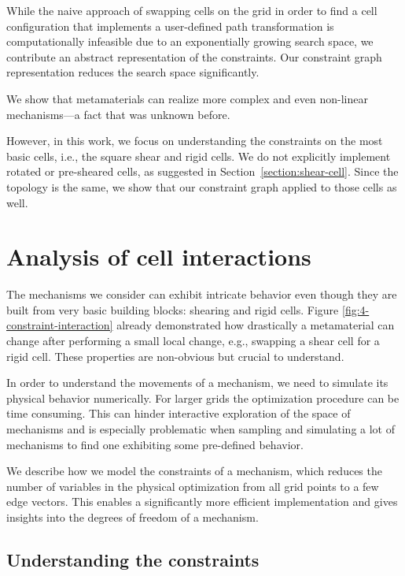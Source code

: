 While the naive approach of swapping cells on the grid in order to find a cell configuration that implements a user-defined path transformation is computationally infeasible due to an exponentially growing search space, we contribute an abstract representation of the constraints. Our constraint graph representation reduces the search space significantly. 

We show that metamaterials can realize more complex and even non-linear mechanisms---a fact that was unknown before.

However, in this work, we focus on understanding the constraints on the most basic cells, i.e., the square shear and rigid cells. We do not explicitly implement rotated or pre-sheared cells, as suggested in Section~\ref{section:shear-cell}. Since the topology is the same, we show that our constraint graph applied to those cells as well. 


\section{Analysis of cell interactions}

The mechanisms we consider can exhibit intricate behavior even though they are built from very basic building blocks: shearing and rigid cells. Figure \ref{fig:4-constraint-interaction} already demonstrated how drastically a metamaterial can change after performing a small local change, e.g., swapping a shear cell for a rigid cell. These properties are non-obvious but crucial to understand.

In order to understand the movements of a mechanism, we need to simulate its physical behavior numerically. For larger grids the optimization procedure can be time consuming. This can hinder interactive exploration of the space of mechanisms and is especially problematic when sampling and simulating a lot of mechanisms to find one exhibiting some pre-defined behavior.

We describe how we model the constraints of a mechanism, which reduces the number of variables in the physical optimization from all grid points to a few edge vectors. This enables a significantly more efficient implementation and gives insights into the degrees of freedom of a mechanism.


\subsection{Understanding the constraints}
\label{section:graph}

